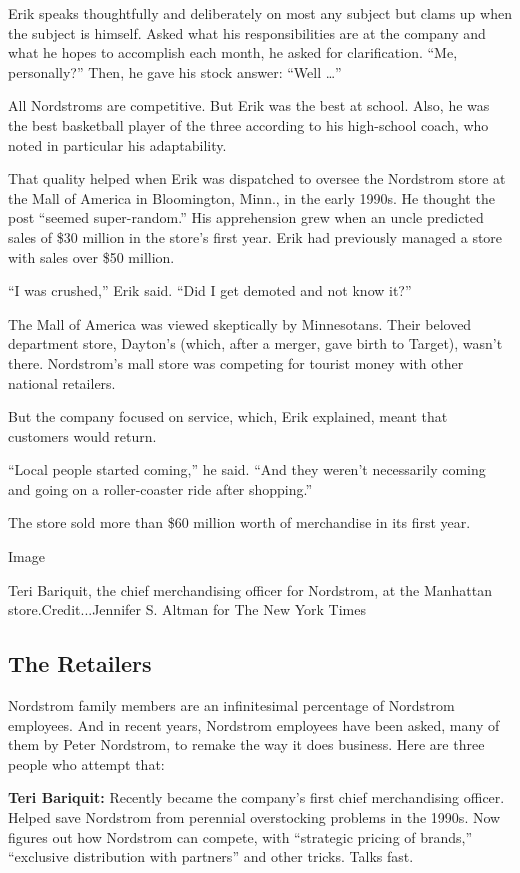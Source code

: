 Erik speaks thoughtfully and deliberately on most any subject but clams
up when the subject is himself. Asked what his responsibilities are at
the company and what he hopes to accomplish each month, he asked for
clarification. ``Me, personally?'' Then, he gave his stock answer:
``Well \ldots{}''

All Nordstroms are competitive. But Erik was the best at school. Also,
he was the best basketball player of the three according to his
high-school coach, who noted in particular his adaptability.

That quality helped when Erik was dispatched to oversee the Nordstrom
store at the Mall of America in Bloomington, Minn., in the early 1990s.
He thought the post ``seemed super-random.'' His apprehension grew when
an uncle predicted sales of \$30 million in the store's first year. Erik
had previously managed a store with sales over \$50 million.

``I was crushed,'' Erik said. ``Did I get demoted and not know it?''

The Mall of America was viewed skeptically by Minnesotans. Their beloved
department store, Dayton's (which, after a merger, gave birth to
Target), wasn't there. Nordstrom's mall store was competing for tourist
money with other national retailers.

But the company focused on service, which, Erik explained, meant that
customers would return.

``Local people started coming,'' he said. ``And they weren't necessarily
coming and going on a roller-coaster ride after shopping.''

The store sold more than \$60 million worth of merchandise in its first
year.

Image

Teri Bariquit, the chief merchandising officer for Nordstrom, at the
Manhattan store.Credit...Jennifer S. Altman for The New York Times

\hypertarget{the-retailers}{%
\subsection{The Retailers}\label{the-retailers}}

Nordstrom family members are an infinitesimal percentage of Nordstrom
employees. And in recent years, Nordstrom employees have been asked,
many of them by Peter Nordstrom, to remake the way it does business.
Here are three people who attempt that:

\textbf{Teri Bariquit:} Recently became the company's first chief
merchandising officer. Helped save Nordstrom from perennial overstocking
problems in the 1990s. Now figures out how Nordstrom can compete, with
``strategic pricing of brands,'' ``exclusive distribution with
partners'' and other tricks. Talks fast.

